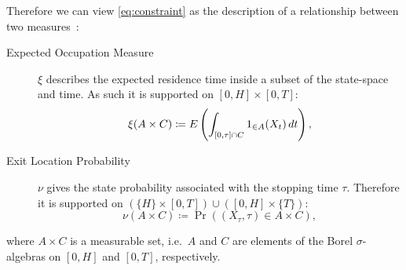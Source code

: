 Therefore we can view \eqref{eq:constraint} as the description of a relationship between
two measures~\cite[Chapter~9.2]{lasserre2010moments}:
\begin{description}
\item[Expected Occupation Measure] $\xi$ describes the expected residence time inside a subset of the state-space and time. As such it is supported on $[0,H]\times [0,T]$:
\begin{equation}\label{eq:ex_occ_measure}
    \xi(A\times C) \coloneqq {E}\left(\int_{[0,\tau]\cap {C}}{1}_{\in A}(X_t)\,dt\right),
\end{equation}
\item [Exit Location Probability] $\nu$ gives the state probability associated with the stopping time $\tau$. Therefore it is supported on $(\{H\}\times[0,T]) \cup
([0,H]\times\{T\})$:
\begin{equation}\label{eq:exit_loc_measure}
    \nu(A\times C)\coloneqq \Pr((X_{\tau},\tau)\in A\times C),
\end{equation}
\end{description}
where $A\times C$ is a measurable set, i.e.\ $A$ and $C$ are elements of the Borel $\sigma$-algebras on $[0,H]$ and $[0,T]$, respectively.

